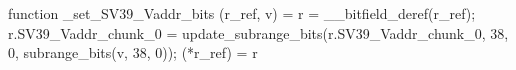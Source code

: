 function _set_SV39_Vaddr_bits (r_ref, v) = {
    r = __bitfield_deref(r_ref);
    r.SV39_Vaddr_chunk_0 = update_subrange_bits(r.SV39_Vaddr_chunk_0, 38, 0, subrange_bits(v, 38, 0));
    (*r_ref) = r
}
